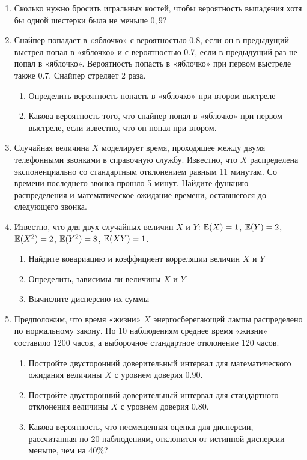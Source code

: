 \documentclass[12pt, a4paper]{article}\usepackage[]{graphicx}\usepackage[]{color}
\begin{document}
	\begin{enumerate}

		\item Сколько нужно бросить игральных костей, чтобы вероятность выпадения хотя бы одной шестерки была не меньше $0{,}9$?
		\item Снайпер попадает в «яблочко» с вероятностью 0.8, если он в предыдущий выстрел попал в «яблочко» и с вероятностью 0.7, если в предыдущий раз не попал в  «яблочко». Вероятность попасть в «яблочко» при первом выстреле также 0.7. Снайпер стреляет 2 раза.
		\begin{enumerate}
			\item Определить вероятность попасть в «яблочко» при втором выстреле
			\item Какова вероятность того, что снайпер попал в «яблочко» при первом выстреле, если известно, что он попал при втором.
		\end{enumerate}
		\item Случайная величина $X$ моделирует время, проходящее между двумя телефонными звонками в справочную службу. Известно, что $X$ распределена экспоненциально со стандартным отклонением равным 11 минутам. Со времени последнего звонка прошло 5 минут. Найдите функцию распределения и математическое ожидание времени, оставшегося до следующего звонка.
		\item Известно, что для двух случайных величин $X$ и $Y$: $\mathbb{E}(X)=1$, $\mathbb{E}(Y)=2$, $\mathbb{E}(X^2)=2$, $\mathbb{E}(Y^2)=8$, $\mathbb{E}(XY)=1$.
		\begin{enumerate}
			\item Найдите ковариацию и коэффициент корреляции величин $X$ и $Y$
			\item Определить, зависимы ли величины $X$ и $Y$
			\item Вычислите дисперсию их суммы
		\end{enumerate}
		\item Предположим, что время «жизни» $X$ энергосберегающей лампы распределено по нормальному закону. По 10 наблюдениям среднее время «жизни» составило 1200 часов, а выборочное стандартное отклонение 120 часов.
		\begin{enumerate}
			\item Постройте двусторонний доверительный интервал для математического ожидания величины $X$ с уровнем доверия 0.90.
			\item Постройте двусторонний доверительный интервал для стандартного отклонения величины $X$ с уровнем доверия 0.80.
			\item Какова вероятность, что несмещенная оценка для дисперсии, рассчитанная по 20 наблюдениям, отклонится от истинной дисперсии меньше, чем на 40\%?

\end{enumerate}
\end{enumerate}
\end{document}

